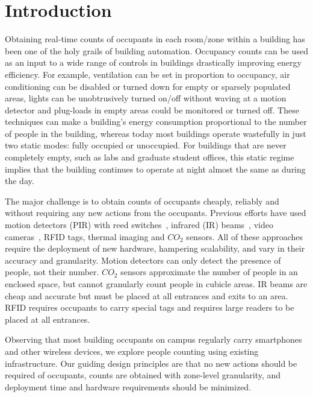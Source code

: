 \section{Introduction}

Obtaining real-time counts of occupants in each room/zone within a building has been one of the holy grails of building automation. Occupancy counts can be used as an input to a wide range of controls in buildings drastically improving energy efficiency. For example,  ventilation can be set in proportion to occupancy, air conditioning can be disabled or turned down for empty or sparsely populated areas, lights can be unobtrusively turned on/off without waving at a motion detector and plug-loads in empty areas could be monitored or turned off. These techniques can make a building's energy consumption proportional to the number of people in the building, whereas today most buildings operate wastefully in just two static modes: fully occupied or unoccupied. For buildings that are never completely empty, such as labs and graduate student offices, this static regime implies that the building continues to operate at night almost the same as during the day.

The major challenge is to obtain counts of occupants cheaply, reliably and without requiring any new actions from the occupants. Previous efforts have used motion detectors (PIR) with reed switches~\cite{Agarwal2010, Lu2010}, infrared (IR) beams~\cite{sun9}, video cameras~\cite{Erickson11}, RFID tags, thermal imaging and $CO_2$ sensors. All of these approaches require the deployment of new hardware, hampering scalability, and vary in their accuracy and granularity. Motion detectors can only detect the presence of people, not their number. $CO_2$ sensors approximate the number of people in an enclosed space, but cannot granularly count people in cubicle areas. IR beams are cheap and accurate but must be placed at all entrances and exits to an area. RFID requires occupants to carry special tags and requires large readers to be placed at all entrances. 

Observing that most building occupants on campus regularly carry smartphones and other wireless devices, we explore people counting using existing infrastructure. Our guiding design principles are that no new actions should be required of occupants, counts are obtained with zone-level granularity, and deployment time and hardware requirements should be minimized.


